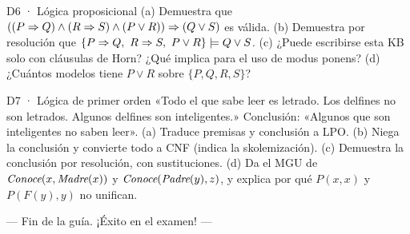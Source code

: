 \begin{ejercicio}{D6 · Lógica proposicional }
(a) Demuestra que $((P\Rightarrow Q)\wedge(R\Rightarrow S)\wedge(P\vee R))\Rightarrow(Q\vee S)$ es válida. 
(b) Demuestra por resolución que $\{P\Rightarrow Q,\ R\Rightarrow S,\ P\vee R\}\models Q\vee S$. 
(c) ¿Puede escribirse esta KB solo con cláusulas de Horn? ¿Qué implica para el uso de modus ponens? 
(d) ¿Cuántos modelos tiene $P\vee R$ sobre $\{P,Q,R,S\}$? 
\end{ejercicio}

\begin{ejercicio}{D7 · Lógica de primer orden }
«Todo el que sabe leer es letrado. Los delfines no son letrados. Algunos delfines son inteligentes.»
Conclusión: «Algunos que son inteligentes no saben leer».
(a) Traduce premisas y conclusión a LPO. 
(b) Niega la conclusión y convierte todo a CNF (indica la skolemización). 
(c) Demuestra la conclusión por resolución, con sustituciones. 
(d) Da el MGU de $\textit{Conoce}(x,\textit{Madre}(x))$ y $\textit{Conoce}(\textit{Padre}(y),z)$, y explica por qué
$P(x,x)$ y $P(F(y),y)$ no unifican. 
\end{ejercicio}



\vfill
\begin{center}\textcolor{gris}{— Fin de la guía. ¡Éxito en el examen! —}\end{center}


